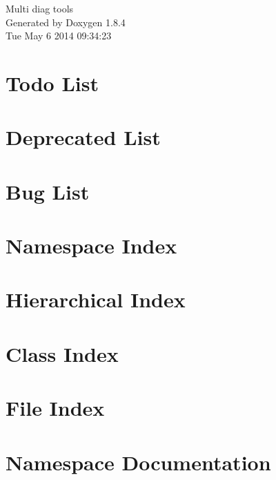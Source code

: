 \documentclass[twoside]{book}
\newcommand{\clearemptydoublepage}{%
  \newpage{\pagestyle{empty}\cleardoublepage}%
}
\begin{document}
\hypersetup{pageanchor=false}
\begin{titlepage}
\vspace*{7cm}
\begin{center}%
{\Large Multi diag tools }\\
\vspace*{1cm}
{\large Generated by Doxygen 1.8.4}\\
\vspace*{0.5cm}
{\small Tue May 6 2014 09:34:23}\\
\end{center}
\end{titlepage}
\clearemptydoublepage
\tableofcontents
\clearemptydoublepage
{}
\hypersetup{pageanchor=true}

\chapter{Todo List}
\label{todo}
\hypertarget{todo}{}

\chapter{Deprecated List}
\label{deprecated}
\hypertarget{deprecated}{}

\chapter{Bug List}
\label{bug}
\hypertarget{bug}{}

\chapter{Namespace Index}

\chapter{Hierarchical Index}

\chapter{Class Index}

\chapter{File Index}

\chapter{Namespace Documentation}



\end{document}
